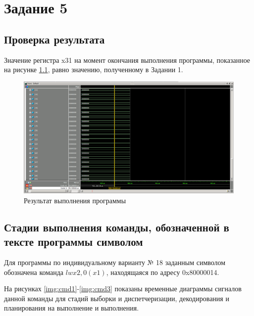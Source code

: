 \chapter{Задание 5}

\section{Проверка результата}

Значение регистра x31 на момент окончания выполнения программы, показанное на рисунке \ref{img:8}, равно значению, полученному в Задании 1.

\begin{figure}[H]
	\begin{center}
		\includegraphics[scale=0.3]{img/8.png}
	\end{center}
	\captionsetup{justification=centering}
	\caption{Результат выполнения программы}
	\label{img:8}
\end{figure}

\section{Стадии выполнения команды, обозначенной в тексте программы символом}

Для программы по индивидуальному варианту № 18 заданным символом обозначена команда $lw x2,0(x1)$, находящаяся по адресу 0x80000014.

На рисунках \ref{img:cmd1}-\ref{img:cmd3} показаны временные диаграммы сигналов данной команды для стадий выборки и диспетчеризации, декодирования и планирования на выполнение и выполнения.

